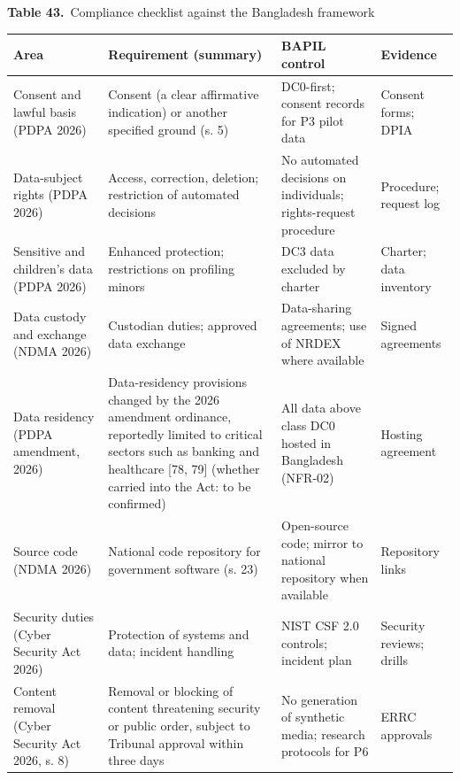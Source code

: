 \documentclass[border=10pt]{standalone}
\begin{document}
\begin{minipage}{17cm}
{\large\bfseries Table 43.}\ {\large Compliance checklist against the Bangladesh framework}\par\vspace{7pt}
\small
{}
\begin{tabularx}{\linewidth}{@{}>{\hsize=0.800\hsize\raggedright\arraybackslash}X>{\hsize=1.224\hsize\raggedright\arraybackslash}X>{\hsize=1.129\hsize\raggedright\arraybackslash}X>{\hsize=0.847\hsize\raggedright\arraybackslash}X@{}}
\arrayrulecolor{bapilrule}\toprule
\rowcolor{white}\textbf{Area} & \textbf{Requirement (summary)} & \textbf{BAPIL control} & \textbf{Evidence} \\
\midrule
Consent and lawful basis (PDPA 2026) & Consent (a clear affirmative indication) or another specified ground (s. 5) & DC0-first; consent records for P3 pilot data & Consent forms; DPIA \\
Data-subject rights (PDPA 2026) & Access, correction, deletion; restriction of automated decisions & No automated decisions on individuals; rights-request procedure & Procedure; request log \\
Sensitive and children’s data (PDPA 2026) & Enhanced protection; restrictions on profiling minors & DC3 data excluded by charter & Charter; data inventory \\
Data custody and exchange (NDMA 2026) & Custodian duties; approved data exchange & Data-sharing agreements; use of NRDEX where available & Signed agreements \\
Data residency (PDPA amendment, 2026) & Data-residency provisions changed by the 2026 amendment ordinance, reportedly limited to critical sectors such as banking and healthcare [78, 79] (whether carried into the Act: to be confirmed) & All data above class DC0 hosted in Bangladesh (NFR-02) & Hosting agreement \\
Source code (NDMA 2026) & National code repository for government software (s. 23) & Open-source code; mirror to national repository when available & Repository links \\
Security duties (Cyber Security Act 2026) & Protection of systems and data; incident handling & NIST CSF 2.0 controls; incident plan & Security reviews; drills \\
Content removal (Cyber Security Act 2026, s. 8) & Removal or blocking of content threatening security or public order, subject to Tribunal approval within three days & No generation of synthetic media; research protocols for P6 & ERRC approvals \\

\end{tabularx}
\end{minipage}
\end{document}
